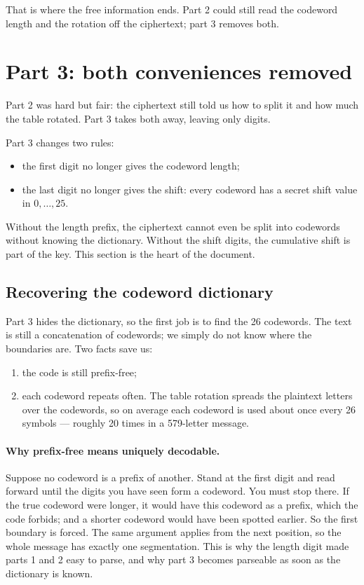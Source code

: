 \documentclass[11pt]{article}
\begin{document}
That is where the free information ends.  Part 2 could still read the codeword
length and the rotation off the ciphertext; part 3 removes both.

\section{Part 3: both conveniences removed}\label{sec:part3}

Part 2 was hard but fair: the ciphertext still told us how to split it and how
much the table rotated.  Part 3 takes both away, leaving only digits.

Part 3 changes two rules:

\begin{itemize}
  \item the first digit no longer gives the codeword length;
  \item the last digit no longer gives the shift: every codeword has a secret
        shift value in $0,\dots,25$.
\end{itemize}

Without the length prefix, the ciphertext cannot even be split into codewords
without knowing the dictionary.  Without the shift digits, the cumulative
shift is part of the key.  This section is the heart of the document.

\subsection{Recovering the codeword dictionary}\label{sec:dict}

Part 3 hides the dictionary, so the first job is to find the 26 codewords.
The text is still a concatenation of codewords; we simply do not know where
the boundaries are.  Two facts save us:

\begin{enumerate}[label=\arabic*.]
  \item the code is still prefix-free;
  \item each codeword repeats often.  The table rotation spreads the plaintext
        letters over the codewords, so on average each codeword is used about
        once every 26 symbols --- roughly 20 times in a 579-letter message.
\end{enumerate}

\paragraph{Why prefix-free means uniquely decodable.}  Suppose no codeword is
a prefix of another.  Stand at the first digit and read forward until the
digits you have seen form a codeword.  You must stop there.  If the true
codeword were longer, it would have this codeword as a prefix, which the code
forbids; and a shorter codeword would have been spotted earlier.  So the first
boundary is forced.  The same argument applies from the next position, so the
whole message has exactly one segmentation.  This is why the length digit made
parts 1 and 2 easy to parse, and why part 3 becomes parseable as soon as the
dictionary is known.
\end{document}
